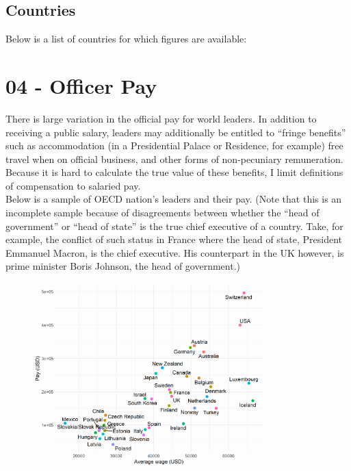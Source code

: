 \documentclass[11pt, letterpaper, twoside]{article}
\begin{document}
\subsection{Countries}
Below is a list of countries for which figures are available:


\section{04 - Officer Pay}
There is large variation in the official pay for world leaders. In addition to receiving a public salary, leaders may additionally be entitled to ``fringe benefits'' such as accommodation (in a Presidential Palace or Residence, for example) free travel when on official business, and other forms of non-pecuniary remuneration. Because it is hard to calculate the true value of these benefits, I limit definitions of compensation to salaried pay.\\

Below is a sample of OECD nation's leaders and their pay. (Note that this is an incomplete sample because of disagreements between whether the ``head of government'' or ``head of state'' is the true chief executive of a country. Take, for example, the conflict of such status in France where the head of state, President Emmanuel Macron, is the chief executive. His counterpart in the UK however, is prime minister Boris Johnson, the head of government.)

\begin{figure}
    \centering
    \includegraphics[clip, width=0.8\textwidth]{figures/leader_pay.png}
\end{figure}





\nocite{bell2016rulers}
\newpage


\newpage
\end{document}
